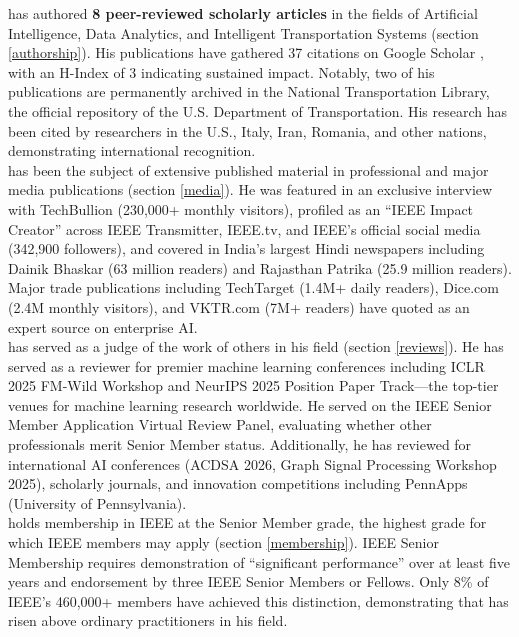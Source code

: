 \documentclass[11pt]{article}
\begin{document}
\dr has authored \textbf{8 peer-reviewed scholarly articles} in the fields of Artificial Intelligence, Data Analytics, and Intelligent Transportation Systems (section \ref{authorship}). His publications have gathered 37 citations on Google Scholar \cite{gscholar}, with an H-Index of 3 indicating sustained impact. Notably, two of his publications are permanently archived in the National Transportation Library, the official repository of the U.S. Department of Transportation. His research has been cited by researchers in the U.S., Italy, Iran, Romania, and other nations, demonstrating international recognition.\\

\dr has been the subject of extensive published material in professional and major media publications (section \ref{media}). He was featured in an exclusive interview with TechBullion (230,000+ monthly visitors), profiled as an ``IEEE Impact Creator'' across IEEE Transmitter, IEEE.tv, and IEEE's official social media (342,900 followers), and covered in India's largest Hindi newspapers including Dainik Bhaskar (63 million readers) and Rajasthan Patrika (25.9 million readers). Major trade publications including TechTarget (1.4M+ daily readers), Dice.com (2.4M monthly visitors), and VKTR.com (7M+ readers) have quoted \dr as an expert source on enterprise AI.\\

\dr has served as a judge of the work of others in his field (section \ref{reviews}). He has served as a reviewer for premier machine learning conferences including ICLR 2025 FM-Wild Workshop and NeurIPS 2025 Position Paper Track---the top-tier venues for machine learning research worldwide. He served on the IEEE Senior Member Application Virtual Review Panel, evaluating whether other professionals merit Senior Member status. Additionally, he has reviewed for international AI conferences (ACDSA 2026, Graph Signal Processing Workshop 2025), scholarly journals, and innovation competitions including PennApps (University of Pennsylvania).\\

\dr holds membership in IEEE at the Senior Member grade, the highest grade for which IEEE members may apply (section \ref{membership}). IEEE Senior Membership requires demonstration of ``significant performance'' over at least five years and endorsement by three IEEE Senior Members or Fellows. Only 8\% of IEEE's 460,000+ members have achieved this distinction, demonstrating that \dr has risen above ordinary practitioners in his field.\\
\end{document}
